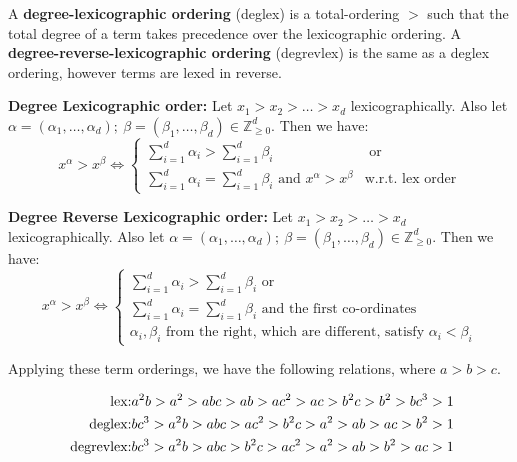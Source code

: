A {\bf degree-lexicographic ordering} (deglex) is a total-ordering $>$ such 
that the total degree of a term takes precedence over the lexicographic 
ordering.  
A {\bf degree-reverse-lexicographic ordering} (degrevlex) is the same as a
deglex ordering, however terms are lexed in reverse.

\begin{Definition}
{\bf Degree Lexicographic order:} Let $x_1 > x_2 > \dots > x_d$
lexicographically. Also let $\alpha = (\alpha_1, \dots, \alpha_d);
~\beta = (\beta_1, \dots, \beta_d) \in \mathbb{Z}^d_{\geq 0}$. Then we
have: 
\begin{equation}
x^{\alpha} > x^{\beta} \iff 
\begin{cases}
\sum_{i=1}^{d}\alpha_i > \sum_{i=1}^{d} \beta_i & \text{ or }\\
\sum_{i=1}^{d}\alpha_i = \sum_{i=1}^{d} \beta_i  \text{ and }
x^{\alpha} > x^{\beta} & \text{w.r.t. lex order}
\end{cases}
\end{equation}
\end{Definition}


\begin{Definition}
{\bf Degree Reverse Lexicographic order:} Let $x_1 > x_2 > \dots > x_d$
lexicographically. Also let $\alpha = (\alpha_1, \dots, \alpha_d);
~\beta = (\beta_1, \dots, \beta_d) \in \mathbb{Z}^d_{\geq 0}$. Then we
have: 
\begin{equation}
x^{\alpha} > x^{\beta} \iff 
\begin{cases}
\sum_{i=1}^{d}\alpha_i > \sum_{i=1}^{d} \beta_i  \text{ or }\\
\sum_{i=1}^{d}\alpha_i = \sum_{i=1}^{d} \beta_i  \text{ and the first co-ordinates}\\
\text{$\alpha_i, \beta_i$ from the right, which are different, satisfy $\alpha_i < \beta_i$}
\end{cases}
\end{equation}

\end{Definition}

Applying these term orderings, we have the following relations, 
where $a > b > c$.

\begin{eqnarray}
    \eqntext{lex:}  
    a^2b > a^2 > abc > ab > ac^2 > ac > b^2c > b^2 > bc^3 > 1 
    \label{ex:ordering:lex}\\
    \eqntext{deglex:} 
    bc^3 > a^2b > abc > ac^2 > b^2c > a^2 > ab >
    ac > b^2 > 1
    \label{ex:ordering:deglex}\\
    \eqntext{degrevlex:}  
    bc^3 > a^2b > abc > b^2c > ac^2 > a^2 > ab >
    b^2 > ac > 1
    \label{ex:ordering:degrevlex}
\end{eqnarray}

